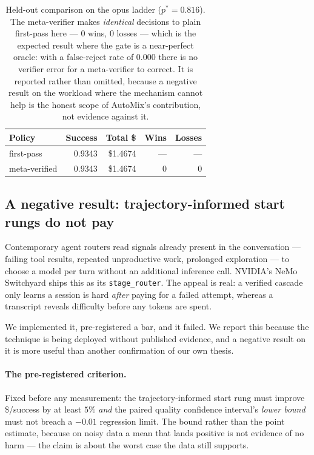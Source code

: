 \documentclass[11pt]{article}
\begin{document}
\begin{table}[h]
\centering
\begin{tabular}{@{}lrrrr@{}}
\toprule
\textbf{Policy} & \textbf{Success} & \textbf{Total \$} & \textbf{Wins} & \textbf{Losses} \\
\midrule
first-pass     & 0.9343 & \$1.4674 & --- & --- \\
meta-verified  & 0.9343 & \$1.4674 & 0 & 0 \\
\bottomrule
\end{tabular}
\caption{Held-out comparison on the opus ladder ($p^\ast = 0.816$). The meta-verifier makes
\emph{identical} decisions to plain first-pass here --- 0 wins, 0 losses --- which is the expected
result where the gate is a near-perfect oracle: with a false-reject rate of 0.000 there is no
verifier error for a meta-verifier to correct. It is reported rather than omitted, because a
negative result on the workload where the mechanism cannot help is the honest scope of AutoMix's
contribution, not evidence against it.}
\end{table}

\subsection{A negative result: trajectory-informed start rungs do not pay}
\label{sec:trajectory}

Contemporary agent routers read signals already present in the conversation --- failing tool
results, repeated unproductive work, prolonged exploration --- to choose a model per turn without an
additional inference call. NVIDIA's NeMo Switchyard ships this as its \texttt{stage\_router}. The
appeal is real: a verified cascade only learns a session is hard \emph{after} paying for a failed
attempt, whereas a transcript reveals difficulty before any tokens are spent.

We implemented it, pre-registered a bar, and it failed. We report this because the technique is
being deployed without published evidence, and a negative result on it is more useful than another
confirmation of our own thesis.

\paragraph{The pre-registered criterion.} Fixed before any measurement: the trajectory-informed
start rung must improve \$/success by at least $5\%$ \emph{and} the paired quality confidence
interval's \emph{lower bound} must not breach a $-0.01$ regression limit. The bound rather than the
point estimate, because on noisy data a mean that lands positive is not evidence of no harm --- the
claim is about the worst case the data still supports.
\end{document}
